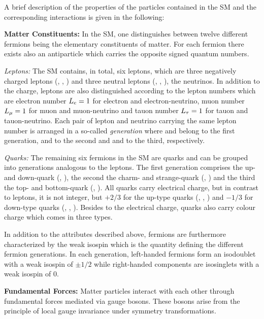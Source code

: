 A brief description of the properties of the particles contained in the SM and the corresponding interactions is given in the following:
\begin{description}

\item \textbf{Matter Constituents:}
In the SM, one distinguishes between twelve different fermions being the elementary constituents of matter. For each fermion there exists also an antiparticle which carries the opposite signed quantum numbers.
 \begin{description}
  \item \textit{Leptons:} The SM contains, in total, six leptons, which are three negatively charged leptons (\lel, \lmu, \ltau) and three neutral leptons (\nue, \numu, \nutau), the neutrinos. In addition to the charge, leptons are also distinguished according to the lepton numbers which are electron number $L_{e} = 1$ for electron and electron-neutrino, muon number $L_{\mu} = 1$ for muon and muon-neutrino and tauon number $L_{\tau} = 1$ for tauon and tauon-neutrino. Each pair of lepton and neutrino carrying the same lepton number is arranged in a so-called \textit{generation} where \lel and \nue belong to the first generation, \lmu and \numu to the second and \ltau and \nutau to the third, respectively.
  \item \textit{Quarks:} The remaining six fermions in the SM are quarks and can be grouped into generations analogous to the leptons. The first generation comprises the up- and down-quark (\qu, \qd), the second the charm- and strange-quark (\qc, \qs) and the third the top- and bottom-quark (\qt, \qb). All quarks carry electrical charge, but in contrast to leptons, it is not integer, but $+2/3$ for the up-type quarks (\qu, \qc, \qt) and $-1/3$ for down-type quarks (\qd, \qs, \qb). Besides to the electrical charge, quarks also carry colour charge which comes in three types.
 \end{description}
In addition to the attributes described above, fermions are furthermore characterized by the weak isospin which is the quantity defining the different fermion generations. In each generation, left-handed fermions form an isodoublet with a weak isospin of $\pm 1/2$ while right-handed components are isosinglets with a weak isospin of 0. 
\item \textbf{Fundamental Forces:}
Matter particles interact with each other through fundamental forces mediated via gauge bosons. These bosons arise from the principle of local gauge invariance under symmetry transformations. 

\end{description}
